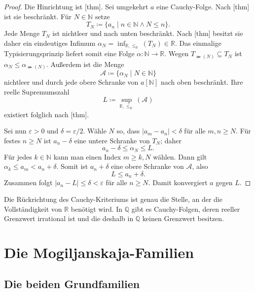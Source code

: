 \documentclass[main.tex]{subfiles}
\providecommand{\RealLe}{\mathrel{\leq_{\mathbb R}}}
\begin{document}
\begin{proof}
Die Hinrichtung ist
[thm]. Sei umgekehrt \(a\) eine
Cauchy-Folge. Nach
[thm] ist sie beschränkt. Für
\(N\in\mathbb N\) setze
\[
  T_N\coloneqq
  \{a_n\mid n\in\mathbb N\land N\leq n\}.
\]
Jede Menge \(T_N\) ist nichtleer und nach unten beschränkt. Nach
[thm] besitzt sie daher ein
eindeutiges Infimum
\(\alpha_N=\inf_{\mathbb R,\RealLe}(T_N)\in\mathbb R\). Das einmalige
Typisierungsprinzip liefert somit eine Folge
\(\alpha\colon\mathbb N\to\mathbb R\). Wegen
\(T_{\Succ(N)}\subseteq T_N\) ist \(\alpha_N\leq\alpha_{\Succ(N)}\).
Außerdem ist die Menge
\[
  \mathcal A\coloneqq\{\alpha_N\mid N\in\mathbb N\}
\]
nichtleer und durch jede obere Schranke von \(a[\mathbb N]\) nach oben
beschränkt. Ihre reelle Supremumszahl
\[
  L\coloneqq\sup_{\mathbb R,\RealLe}(\mathcal A)
\]
existiert folglich nach
[thm].

Sei nun \(\varepsilon>0\) und
\(\delta=\varepsilon/2\). Wähle \(N\) so, dass
\(|a_m-a_n|<\delta\) für alle \(m,n\geq N\). Für festes \(n\geq N\)
ist \(a_n-\delta\) eine untere Schranke von \(T_N\); daher
\[
  a_n-\delta\leq\alpha_N\leq L.
\]
Für jedes \(k\in\mathbb N\) kann man einen Index \(m\geq k,N\) wählen.
Dann gilt
\(\alpha_k\leq a_m<a_n+\delta\). Somit ist \(a_n+\delta\) eine obere
Schranke von \(\mathcal A\), also
\[
  L\leq a_n+\delta.
\]
Zusammen folgt \(|a_n-L|\leq\delta<\varepsilon\) für alle \(n\geq N\).
Damit konvergiert \(a\) gegen \(L\).
\end{proof}

Die Rückrichtung des Cauchy-Kriteriums ist genau die Stelle, an der die
Vollständigkeit von \(\mathbb R\) benötigt wird. In \(\mathbb Q\) gibt es
Cauchy-Folgen, deren reeller Grenzwert irrational ist und die deshalb in
\(\mathbb Q\) keinen Grenzwert besitzen.

\chapter{Die Mogiljanskaja-Familien}

\section{Die beiden Grundfamilien}
\end{document}
